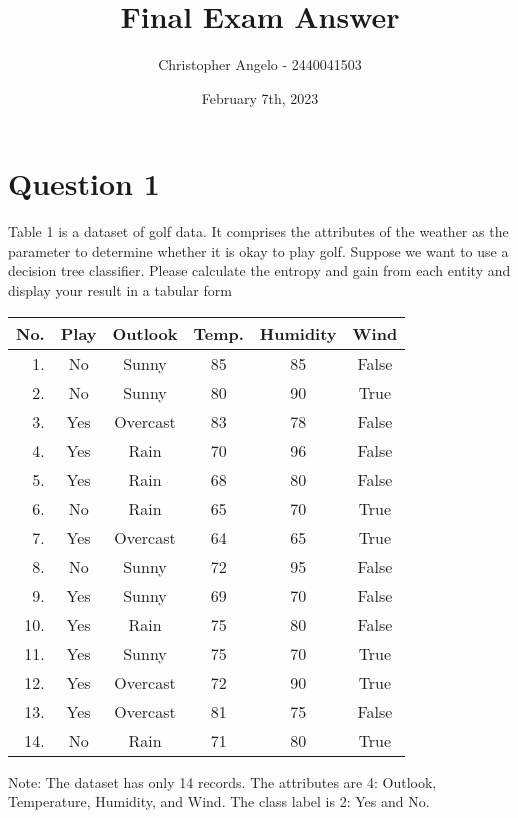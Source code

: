 \documentclass[
  11pt, %
]{assignment}
\author{Christopher Angelo - 2440041503}
\institute{BINUS University\\ Global Class}
\date{February 7th, 2023}
\title{Final Exam Answer}
\begin{document}
\maketitle


\section*{Question 1}

\begin{problem}
Table 1 is a dataset of golf data. It comprises the attributes of the weather as the parameter to determine whether it is okay to play golf. Suppose we want to use a decision tree classifier. Please calculate the entropy and gain from each entity and display your result in a tabular form

\medskip

\begin{center}
	\begin{tabular}{r | c | c c c c}
		No. & Play & Outlook  & Temp. & Humidity & Wind  \\
		\toprule
		1.  & No   & Sunny    & 85    & 85       & False \\
		2.  & No   & Sunny    & 80    & 90       & True  \\
		3.  & Yes  & Overcast & 83    & 78       & False \\
		4.  & Yes  & Rain     & 70    & 96       & False \\
		5.  & Yes  & Rain     & 68    & 80       & False \\
		6.  & No   & Rain     & 65    & 70       & True  \\
		7.  & Yes  & Overcast & 64    & 65       & True  \\
		8.  & No   & Sunny    & 72    & 95       & False \\
		9.  & Yes  & Sunny    & 69    & 70       & False \\
		10. & Yes  & Rain     & 75    & 80       & False \\
		11. & Yes  & Sunny    & 75    & 70       & True  \\
		12. & Yes  & Overcast & 72    & 90       & True  \\
		13. & Yes  & Overcast & 81    & 75       & False \\
		14. & No   & Rain     & 71    & 80       & True  \\
		\bottomrule
	\end{tabular}
\end{center}

\medskip

Note: The dataset has only 14 records. The attributes are 4: Outlook, Temperature, Humidity,
and Wind. The class label is 2: Yes and No.

\end{problem}
\end{document}
